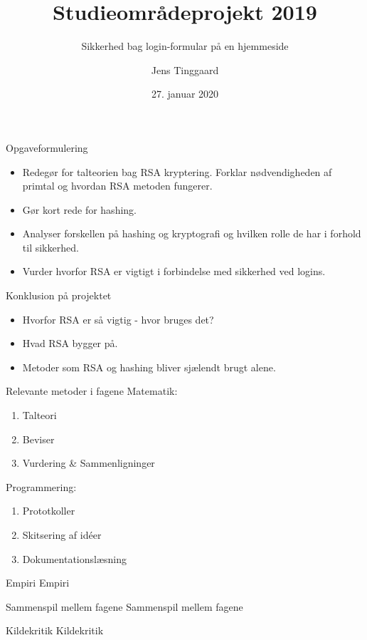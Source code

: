 \documentclass[10pt, aspectratio=169, usepdftitle=false, draft]{beamer}
\title{Studieområdeprojekt 2019}
\subtitle{Sikkerhed bag login-formular på en hjemmeside}
\date{27. januar 2020}
\author{Jens Tinggaard}
\institute{Odense Tekniske Gymnasium}
\begin{document}
\maketitle


\begin{frame}{Opgaveformulering}
\begin{itemize}
    \large
    \item Redegør for talteorien bag RSA kryptering. Forklar nødvendigheden af primtal og hvordan RSA metoden fungerer.
    \item Gør kort rede for hashing.
    \item Analyser forskellen på hashing og kryptografi og hvilken rolle de har i forhold til sikkerhed.
    \item Vurder hvorfor RSA er vigtigt i forbindelse med sikkerhed ved logins.
\end{itemize}
\end{frame}

\begin{frame}{Konklusion på projektet}
    \begin{itemize}
        \large
        \item Hvorfor RSA er så vigtig - hvor bruges det?
        \item Hvad RSA bygger på.
        \item Metoder som RSA og hashing bliver sjælendt brugt alene.
    \end{itemize}
\end{frame}

\begin{frame}{Relevante metoder i fagene}
    Matematik:
    \begin{enumerate}
        \item Talteori
        \item Beviser
        \item Vurdering \& Sammenligninger
    \end{enumerate}\pause
    Programmering:
    \begin{enumerate}
        \item Prototkoller
        \item Skitsering af id\'eer
        \item Dokumentationslæsning
    \end{enumerate}
\end{frame}

\begin{frame}{Empiri}
    Empiri
\end{frame}

\begin{frame}{Sammenspil mellem fagene}
    Sammenspil mellem fagene
\end{frame}

\begin{frame}{Kildekritik}
    Kildekritik
\end{frame}
\end{document}
